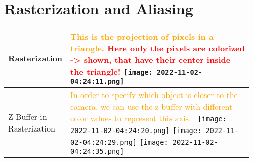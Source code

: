 \documentclass[main.tex,fontsize=8pt,paper=a4,paper=portrait,DIV=calc,]{scrartcl}
\begin{document}
\pagebreak
\begin{table}[ht!]
\section{Rasterization and Aliasing}
\begin{tabular}{|m{0.2\linewidth}|m{0.755\linewidth}|}
\hline
Rasterization & 
\textcolor{orange}{This is the projection of pixels in a triangle.}\newline
\textcolor{red}{\textbf{Here only the pixels are colorized -> shown, that have their center inside the triangle!}}\newline
\texttt{[image: 2022-11-02-04:24:11.png]}\\
\hline
Z-Buffer in Rasterization & 
\textcolor{orange}{In order to specify which object is closer to the camera, we can use the z buffer with different color values to represent this axis.}\newline
\, \newline
\texttt{[image: 2022-11-02-04:24:20.png]}
\texttt{[image: 2022-11-02-04:24:29.png]}
\texttt{[image: 2022-11-02-04:24:35.png]}\\
\hline
\end{tabular}
\end{table}
\pagebreak
\end{document}
